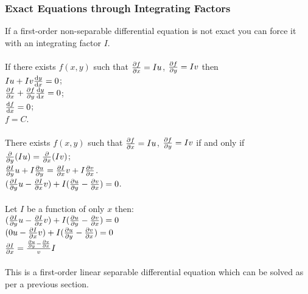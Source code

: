 \documentclass{article}
\begin{document}
			\subsubsection{Exact Equations through Integrating Factors}
				If a first-order non-separable differential equation is not exact you can force it with an integrating factor $I$. \\
				\\
				If there exists $f(x,y)$ such that $\pdv{f}{x} = Iu$, $\pdv{f}{y} = Iv$ then \\
				$Iu + Iv\dv{y}{x} = 0$; \\
				$\pdv{f}{x} + \pdv{f}{y}\dv{y}{x} = 0$; \\
				$\dv{f}{x} = 0$; \\
				$f = C$. \\
				\\
				There exists $f(x,y)$ such that $\pdv{f}{x} = Iu$, $\pdv{f}{y} = Iv$ if and only if \\
				$\pdv{}{y}\qty(Iu) = \pdv{}{x}\qty(Iv)$; \\
				$\pdv{I}{y}u + I\pdv{u}{y} = \pdv{I}{x}v + I\pdv{v}{x}$. \\
				$(\pdv{I}{y}u - \pdv{I}{x}v) + I(\pdv{u}{y} - \pdv{v}{x}) = 0$. \\
				\\
				Let $I$ be a function of only $x$ then: \\
				$(\pdv{I}{y}u - \pdv{I}{x}v) + I(\pdv{u}{y} - \pdv{v}{x}) = 0$ \\
				$(0u - \pdv{I}{x}v) + I(\pdv{u}{y} - \pdv{v}{x}) = 0$ \\
				$\pdv{I}{x} = \frac{\pdv{u}{y} - \pdv{v}{x}}{v}I$ \\
				\\
				This is a first-order linear separable differential equation which can be solved as per a previous section. \\
	
\end{document}
